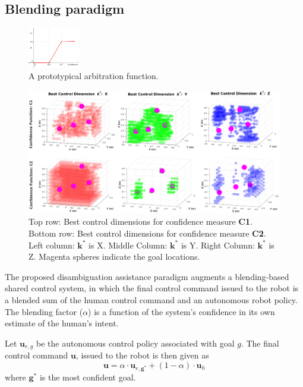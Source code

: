 \documentclass[conference]{IEEEtran}
\begin{document}
\subsection{Blending paradigm}\label{BP}
\begin{figure}
	\begin{center}
		\vspace{-0.9cm}
		\includegraphics[width=0.2\textwidth]{./figures/ArbFunc.png}
	\end{center}
		\vspace{-.45cm}
	\caption{A prototypical arbitration function.}
	\label{ALPHA}
\end{figure}
\begin{figure}[ht]
	\centering
	\includegraphics[width = 0.9\hsize, height = 0.35\vsize]{./figures/POINT_CLOUD.png}
	\caption{Top row: Best control dimensions for confidence measure \textbf{C1}. Bottom row: Best control dimensions for confidence measure \textbf{C2}. Left column: $\boldsymbol{k}^*$ is X. Middle Column: $\boldsymbol{k}^*$ is Y. Right Column: $\boldsymbol{k}^*$ is Z. Magenta spheres indicate the goal locations.}
	\label{HM_SEP}
\end{figure}
The proposed disambiguation assistance paradigm augments a blending-based shared control system, in which the final control command issued to the robot is a blended sum of the human control command and an autonomous robot policy. The blending factor ($\alpha$) is a function of the system's confidence in its own estimate of the human's intent. 

Let $\boldsymbol{u}_{r,g}$ be the autonomous control policy associated with goal $g$. The final control command $\boldsymbol{u}$, issued to the robot is then given as 
\begin{equation*}
\boldsymbol{u} = \alpha\cdot \boldsymbol{u}_{r,\boldsymbol{g}^*} + (1 - \alpha)\cdot \boldsymbol{u}_h
\end{equation*}
where $\boldsymbol{g}^*$ is the most confident goal. 
\end{document}
